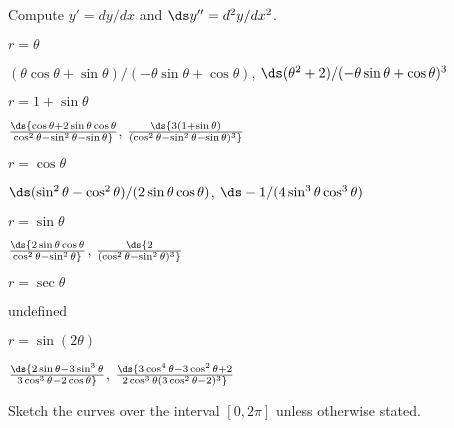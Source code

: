 \begin{exercises}

\noindent Compute $y'=dy/dx$ and $\ds y''=d^2y/dx^2$.

\twocol

\begin{exercise} $r=\theta$
\begin{answer}$(\theta\cos\theta+\sin\theta)/(-\theta\sin\theta+\cos\theta)$,
$\ds (\theta^2+2)/(-\theta\sin\theta+\cos\theta)^3$
\end{answer}\end{exercise}

\begin{exercise} $r=1+\sin\theta$
\begin{answer} $\ds {\cos\theta+2\sin\theta\cos\theta\over
\cos^2\theta-\sin^2\theta-\sin\theta}$,
$\ds {3(1+\sin\theta)\over(\cos^2\theta-\sin^2\theta-\sin\theta)^3}$
\end{answer}\end{exercise}

\begin{exercise} $r=\cos\theta$
\begin{answer} $\ds (\sin^2\theta-\cos^2\theta)/(2\sin\theta\cos\theta)$,
$\ds -1/(4\sin^3\theta\cos^3\theta)$
\end{answer}\end{exercise}

\begin{exercise} $r=\sin\theta$
\begin{answer} $\ds {2\sin\theta\cos\theta\over\cos^2\theta-\sin^2\theta}$,
$\ds {2\over(\cos^2\theta-\sin^2\theta)^3}$
\end{answer}\end{exercise}

\begin{exercise} $r=\sec\theta$
\begin{answer} undefined
\end{answer}\end{exercise}

\begin{exercise} $r=\sin(2\theta)$
\begin{answer} $\ds {2\sin\theta-3\sin^3\theta\over3\cos^3\theta-2\cos\theta}$,
$\ds {3\cos^4\theta-3\cos^2\theta+2\over2\cos^3\theta(3\cos^2\theta-2)^3}$
\end{answer}\end{exercise}

\endtwocol

\bigbreak
\noindent Sketch the curves over the interval $[0,2\pi]$ unless
otherwise stated.


\end{exercises}
